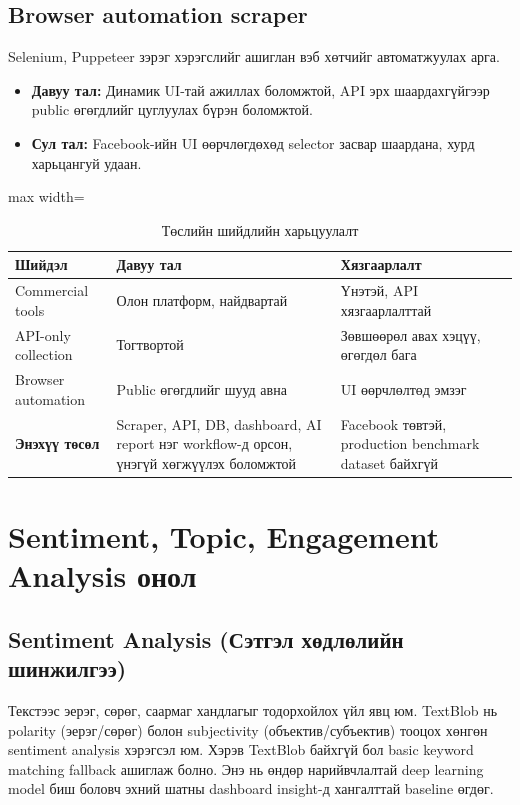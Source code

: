 \subsection{Browser automation scraper}
Selenium, Puppeteer зэрэг хэрэгслийг ашиглан вэб хөтчийг автоматжуулах арга.
\begin{itemize}
    \item \textbf{Давуу тал:} Динамик UI-тай ажиллах боломжтой, API эрх шаардахгүйгээр public өгөгдлийг цуглуулах бүрэн боломжтой.
    \item \textbf{Сул тал:} Facebook-ийн UI өөрчлөгдөхөд selector засвар шаардана, хурд харьцангуй удаан.
\end{itemize}

\begin{table}[htbp]
\centering
\caption{Төслийн шийдлийн харьцуулалт}
\label{tab:system_comparison}
\small
\renewcommand{\arraystretch}{1.28}
\begin{adjustbox}{max width=\textwidth}
\begin{tabular}{|p{4cm}|p{5cm}|p{5cm}|}
\hline
\rowcolor{gray!20}\textbf{Шийдэл} & \textbf{Давуу тал} & \textbf{Хязгаарлалт} \\
\hline
Commercial tools & Олон платформ, найдвартай & Үнэтэй, API хязгаарлалттай \\
\hline
API-only collection & Тогтвортой & Зөвшөөрөл авах хэцүү, өгөгдөл бага \\
\hline
Browser automation & Public өгөгдлийг шууд авна & UI өөрчлөлтөд эмзэг \\
\hline
\textbf{Энэхүү төсөл} & Scraper, API, DB, dashboard, AI report нэг workflow-д орсон, үнэгүй хөгжүүлэх боломжтой & Facebook төвтэй, production benchmark dataset байхгүй \\
\hline
\end{tabular}
\end{adjustbox}
\normalsize
\end{table}

\section{Sentiment, Topic, Engagement Analysis онол}

\subsection{Sentiment Analysis (Сэтгэл хөдлөлийн шинжилгээ)}
Текстээс эерэг, сөрөг, саармаг хандлагыг тодорхойлох үйл явц юм. TextBlob нь polarity (эерэг/сөрөг) болон subjectivity (объектив/субъектив) тооцох хөнгөн sentiment analysis хэрэгсэл юм. Хэрэв TextBlob байхгүй бол basic keyword matching fallback ашиглаж болно. Энэ нь өндөр нарийвчлалтай deep learning model биш боловч эхний шатны dashboard insight-д хангалттай baseline өгдөг.

